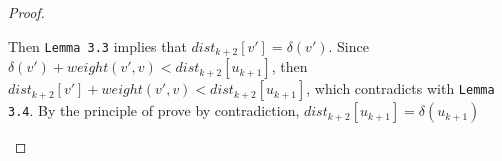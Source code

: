 \documentclass[11pt, oneside]{article}   	%
\newcommand\tsp[1][0.2cm]{\hspace*{#1}}
\theoremstyle{definition}
\begin{document}
\begin{proof}
\begin{itemize}
\begin{enumerate}
  Then \texttt{Lemma 3.3} implies that $dist_{k+2}[v'] = \delta(v')$. Since $\delta(v') + weight(v', v) < dist_{k+2}[u_{k+1}]$, then $dist_{k+2}[v'] + weight(v', v) <  dist_{k+2}[u_{k+1}]$, which contradicts with \texttt{Lemma 3.4}. By the principle of prove by contradiction, $ dist_{k+2}[u_{k+1}] = \delta(u_{k+1})$

\end{enumerate}
\end{itemize}
\end{proof}
\end{document}
